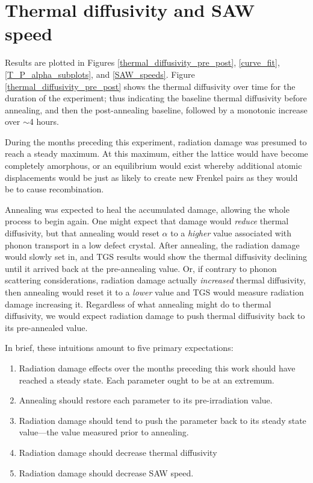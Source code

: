 \section{Thermal diffusivity and SAW speed}
Results are plotted in Figures \ref{thermal_diffusivity_pre_post}, \ref{curve_fit}, \ref{T_P_alpha_subplots}, and \ref{SAW_speeds}.  Figure \ref{thermal_diffusivity_pre_post} shows the thermal diffusivity over time for the duration of the experiment; thus indicating the baseline thermal diffusivity before annealing, and then the post-annealing baseline, followed by a monotonic increase over $\sim$4 hours. 

During the months preceding this experiment, radiation damage was presumed to reach a steady maximum. At this maximum, either the lattice would have become completely amorphous, or an equilibrium would exist whereby additional atomic displacements would be just as likely to create new Frenkel pairs as they would be to cause recombination.

Annealing was expected to heal the accumulated damage, allowing the whole process to begin again. One might expect that damage would \emph{reduce} thermal diffusivity, but that annealing would reset $\alpha$ to a \emph{higher} value associated with phonon transport in a low defect crystal. After annealing, the radiation damage would slowly set in, and TGS results would show the thermal diffusivity declining until it arrived back at the pre-annealing value. Or, if contrary to phonon scattering considerations, radiation damage actually \emph{increased} thermal diffusivity, then annealing would reset it to a \emph{lower} value and TGS would measure radiation damage increasing it. Regardless of what annealing might do to thermal diffusivity, we would expect radiation damage to push thermal diffusivity back to its pre-annealed value.

In brief, these intuitions amount to five primary expectations:
\begin{enumerate}
\item Radiation damage effects over the months preceding this work should have reached a steady state. Each parameter ought to be at an extremum.
\item Annealing should restore each parameter to its pre-irradiation value.
\item Radiation damage should tend to push the parameter back to its steady state value---the value measured prior to annealing.
\item Radiation damage should decrease thermal diffusivity
\item Radiation damage should decrease SAW speed.
\end{enumerate}

